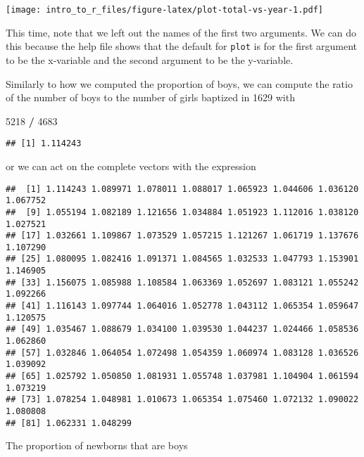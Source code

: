\documentclass[
]{article}
\newenvironment{Shaded}{\begin{snugshade}}{\end{snugshade}}
\newcommand{\DecValTok}[1]{\textcolor[rgb]{0.00,0.00,0.81}{#1}}
\newcommand{\NormalTok}[1]{#1}
\newcommand{\OperatorTok}[1]{\textcolor[rgb]{0.81,0.36,0.00}{\textbf{#1}}}
\newcommand{\StringTok}[1]{\textcolor[rgb]{0.31,0.60,0.02}{#1}}
\begin{document}
\texttt{[image: intro\_to\_r\_files/figure-latex/plot-total-vs-year-1.pdf]}

This time, note that we left out the names of the first two arguments.
We can do this because the help file shows that the default for
\texttt{plot} is for the first argument to be the x-variable and the
second argument to be the y-variable.

Similarly to how we computed the proportion of boys, we can compute the
ratio of the number of boys to the number of girls baptized in 1629 with

\begin{Shaded}
\begin{Highlighting}[]
\DecValTok{5218} \OperatorTok{/}\StringTok{ }\DecValTok{4683}
\end{Highlighting}
\end{Shaded}

\begin{verbatim}
## [1] 1.114243
\end{verbatim}

or we can act on the complete vectors with the expression

\begin{Shaded}
\end{Shaded}

\begin{verbatim}
##  [1] 1.114243 1.089971 1.078011 1.088017 1.065923 1.044606 1.036120 1.067752
##  [9] 1.055194 1.082189 1.121656 1.034884 1.051923 1.112016 1.038120 1.027521
## [17] 1.032661 1.109867 1.073529 1.057215 1.121267 1.061719 1.137676 1.107290
## [25] 1.080095 1.082416 1.091371 1.084565 1.032533 1.047793 1.153901 1.146905
## [33] 1.156075 1.085988 1.108584 1.063369 1.052697 1.083121 1.055242 1.092266
## [41] 1.116143 1.097744 1.064016 1.052778 1.043112 1.065354 1.059647 1.120575
## [49] 1.035467 1.088679 1.034100 1.039530 1.044237 1.024466 1.058536 1.062860
## [57] 1.032846 1.064054 1.072498 1.054359 1.060974 1.083128 1.036526 1.039092
## [65] 1.025792 1.050850 1.081931 1.055748 1.037981 1.104904 1.061594 1.073219
## [73] 1.078254 1.048981 1.010673 1.065354 1.075460 1.072132 1.090022 1.080808
## [81] 1.062331 1.048299
\end{verbatim}

The proportion of newborns that are boys
\end{document}
